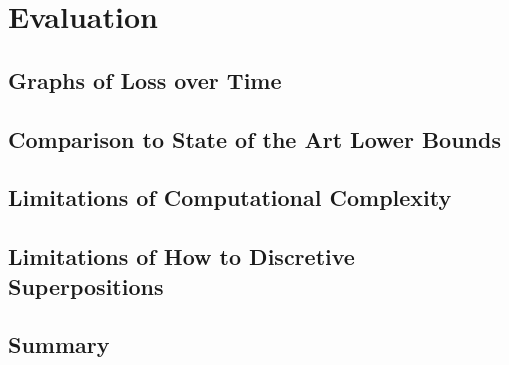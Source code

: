\section{Evaluation}%
\label{sec:evaluation}
\subsection{Graphs of Loss over Time}%
\label{sub:graphs_of_loss_over_time}

\subsection{Comparison to State of the Art Lower Bounds}%
\label{sub:comparison_to_state_of_the_art_lower_bounds}

\subsection{Limitations of Computational Complexity}%
\label{sub:limitations_of_computational_complexity}

\subsection{Limitations of How to Discretive Superpositions}%
\label{sub:limitations_of_how_to_discretize_superpositions}

\subsection{Summary}%
\label{sub:summary}


